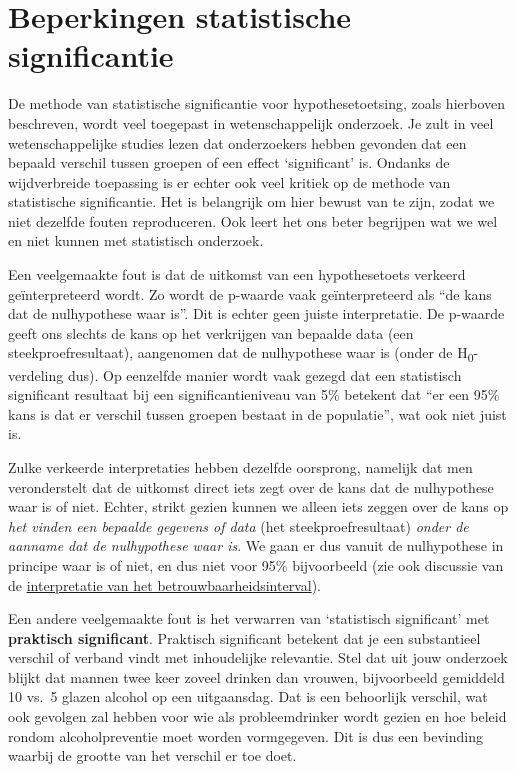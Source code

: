 \documentclass[
  letterpaper,
  DIV=11,
  numbers=noendperiod]{scrreprt}
\begin{document}
\section{Beperkingen statistische
significantie}\label{beperkingen-statistische-significantie}

De methode van statistische significantie voor hypothesetoetsing, zoals
hierboven beschreven, wordt veel toegepast in wetenschappelijk
onderzoek. Je zult in veel wetenschappelijke studies lezen dat
onderzoekers hebben gevonden dat een bepaald verschil tussen groepen of
een effect `significant' is. Ondanks de wijdverbreide toepassing is er
echter ook veel kritiek op de methode van statistische significantie.
Het is belangrijk om hier bewust van te zijn, zodat we niet dezelfde
fouten reproduceren. Ook leert het ons beter begrijpen wat we wel en
niet kunnen met statistisch onderzoek.

Een veelgemaakte fout is dat de uitkomst van een hypothesetoets verkeerd
geïnterpreteerd wordt. Zo wordt de p-waarde vaak geïnterpreteerd als
``de kans dat de nulhypothese waar is''. Dit is echter geen juiste
interpretatie. De p-waarde geeft ons slechts de kans op het verkrijgen
van bepaalde data (een steekproefresultaat), aangenomen dat de
nulhypothese waar is (onder de H\textsubscript{0}-verdeling dus). Op
eenzelfde manier wordt vaak gezegd dat een statistisch significant
resultaat bij een significantieniveau van 5\% betekent dat ``er een 95\%
kans is dat er verschil tussen groepen bestaat in de populatie'', wat
ook niet juist is.

Zulke verkeerde interpretaties hebben dezelfde oorsprong, namelijk dat
men veronderstelt dat de uitkomst direct iets zegt over de kans dat de
nulhypothese waar is of niet. Echter, strikt gezien kunnen we alleen
iets zeggen over de kans op \emph{het vinden een bepaalde gegevens of
data} (het steekproefresultaat) \emph{onder de aanname dat de
nulhypothese waar is}. We gaan er dus vanuit de nulhypothese in principe
waar is of niet, en dus niet voor 95\% bijvoorbeeld (zie ook discussie
van de \hyperref[sec-interpretatiebhi]{interpretatie van het
betrouwbaarheidsinterval}).

Een andere veelgemaakte fout is het verwarren van `statistisch
significant' met \textbf{praktisch significant}. Praktisch significant
betekent dat je een substantieel verschil of verband vindt met
inhoudelijke relevantie. Stel dat uit jouw onderzoek blijkt dat mannen
twee keer zoveel drinken dan vrouwen, bijvoorbeeld gemiddeld 10 vs.~5
glazen alcohol op een uitgaansdag. Dat is een behoorlijk verschil, wat
ook gevolgen zal hebben voor wie als probleemdrinker wordt gezien en hoe
beleid rondom alcoholpreventie moet worden vormgegeven. Dit is dus een
bevinding waarbij de grootte van het verschil er toe doet.
\end{document}
